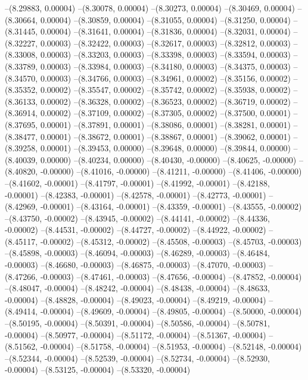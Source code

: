 --(8.29883, 0.00004)
--(8.30078, 0.00004)
--(8.30273, 0.00004)
--(8.30469, 0.00004)
--(8.30664, 0.00004)
--(8.30859, 0.00004)
--(8.31055, 0.00004)
--(8.31250, 0.00004)
--(8.31445, 0.00004)
--(8.31641, 0.00004)
--(8.31836, 0.00004)
--(8.32031, 0.00004)
--(8.32227, 0.00003)
--(8.32422, 0.00003)
--(8.32617, 0.00003)
--(8.32812, 0.00003)
--(8.33008, 0.00003)
--(8.33203, 0.00003)
--(8.33398, 0.00003)
--(8.33594, 0.00003)
--(8.33789, 0.00003)
--(8.33984, 0.00003)
--(8.34180, 0.00003)
--(8.34375, 0.00003)
--(8.34570, 0.00003)
--(8.34766, 0.00003)
--(8.34961, 0.00002)
--(8.35156, 0.00002)
--(8.35352, 0.00002)
--(8.35547, 0.00002)
--(8.35742, 0.00002)
--(8.35938, 0.00002)
--(8.36133, 0.00002)
--(8.36328, 0.00002)
--(8.36523, 0.00002)
--(8.36719, 0.00002)
--(8.36914, 0.00002)
--(8.37109, 0.00002)
--(8.37305, 0.00002)
--(8.37500, 0.00001)
--(8.37695, 0.00001)
--(8.37891, 0.00001)
--(8.38086, 0.00001)
--(8.38281, 0.00001)
--(8.38477, 0.00001)
--(8.38672, 0.00001)
--(8.38867, 0.00001)
--(8.39062, 0.00001)
--(8.39258, 0.00001)
--(8.39453, 0.00000)
--(8.39648, 0.00000)
--(8.39844, 0.00000)
--(8.40039, 0.00000)
--(8.40234, 0.00000)
--(8.40430, -0.00000)
--(8.40625, -0.00000)
--(8.40820, -0.00000)
--(8.41016, -0.00000)
--(8.41211, -0.00000)
--(8.41406, -0.00000)
--(8.41602, -0.00001)
--(8.41797, -0.00001)
--(8.41992, -0.00001)
--(8.42188, -0.00001)
--(8.42383, -0.00001)
--(8.42578, -0.00001)
--(8.42773, -0.00001)
--(8.42969, -0.00001)
--(8.43164, -0.00001)
--(8.43359, -0.00001)
--(8.43555, -0.00002)
--(8.43750, -0.00002)
--(8.43945, -0.00002)
--(8.44141, -0.00002)
--(8.44336, -0.00002)
--(8.44531, -0.00002)
--(8.44727, -0.00002)
--(8.44922, -0.00002)
--(8.45117, -0.00002)
--(8.45312, -0.00002)
--(8.45508, -0.00003)
--(8.45703, -0.00003)
--(8.45898, -0.00003)
--(8.46094, -0.00003)
--(8.46289, -0.00003)
--(8.46484, -0.00003)
--(8.46680, -0.00003)
--(8.46875, -0.00003)
--(8.47070, -0.00003)
--(8.47266, -0.00003)
--(8.47461, -0.00003)
--(8.47656, -0.00004)
--(8.47852, -0.00004)
--(8.48047, -0.00004)
--(8.48242, -0.00004)
--(8.48438, -0.00004)
--(8.48633, -0.00004)
--(8.48828, -0.00004)
--(8.49023, -0.00004)
--(8.49219, -0.00004)
--(8.49414, -0.00004)
--(8.49609, -0.00004)
--(8.49805, -0.00004)
--(8.50000, -0.00004)
--(8.50195, -0.00004)
--(8.50391, -0.00004)
--(8.50586, -0.00004)
--(8.50781, -0.00004)
--(8.50977, -0.00004)
--(8.51172, -0.00004)
--(8.51367, -0.00004)
--(8.51562, -0.00004)
--(8.51758, -0.00004)
--(8.51953, -0.00004)
--(8.52148, -0.00004)
--(8.52344, -0.00004)
--(8.52539, -0.00004)
--(8.52734, -0.00004)
--(8.52930, -0.00004)
--(8.53125, -0.00004)
--(8.53320, -0.00004)
